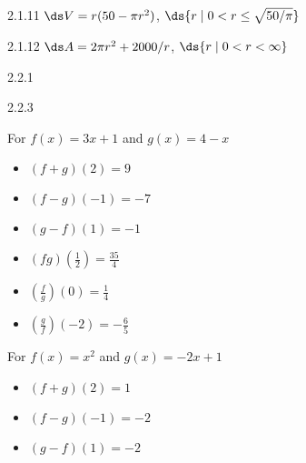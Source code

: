 \begin{Answer}{2.1.11}
$\ds V=r(50-\pi r^2)$, $\ds \{r\mid 0< r\le \sqrt{50/\pi}\}$
\end{Answer}
\begin{Answer}{2.1.12}
$\ds A=2\pi r^2+2000/r$, $\ds \{r\mid 0<r<\infty\}$
\end{Answer}
\begin{Answer}{2.2.1}
\end{Answer}
\begin{Answer}{2.2.3}
	\item For  $f(x) = 3x+1$ and $g(x) = 4-x$

	\begin{multicols}{3}
		\begin{itemize}

			\item  $(f+g)(2) = 9$
			\item  $(f-g)(-1) = -7$
			\item  $(g-f)(1) = -1$

		\end{itemize}
	\end{multicols}

	\begin{multicols}{3}
		\begin{itemize}

			\item  $(fg)\left(\frac{1}{2}\right) = \frac{35}{4}$
			\item  $\left(\frac{f}{g}\right)(0) = \frac{1}{4}$
			\item  $\left(\frac{g}{f}\right)\left(-2\right) = -\frac{6}{5}$

		\end{itemize}
	\end{multicols}

	\item For  $f(x) = x^2$ and $g(x) = -2x+1$

	\begin{multicols}{3}
		\begin{itemize}

			\item  $(f+g)(2) = 1$
			\item  $(f-g)(-1) = -2$
			\item  $(g-f)(1) = -2$

		\end{itemize}
	\end{multicols}

	\begin{multicols}{3}
		\begin{itemize}


\end{itemize}
\end{multicols}
\end{Answer}
